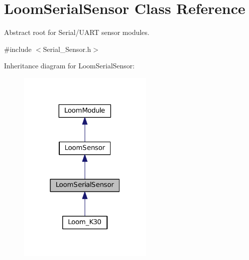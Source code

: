 \hypertarget{class_loom_serial_sensor}{}\section{Loom\+Serial\+Sensor Class Reference}
\label{class_loom_serial_sensor}


Abstract root for Serial/\+U\+A\+RT sensor modules.  




{\ttfamily \#include $<$Serial\+\_\+\+Sensor.\+h$>$}



Inheritance diagram for Loom\+Serial\+Sensor\+:\nopagebreak
\begin{figure}[H]
\begin{center}
\leavevmode
\includegraphics[width=184pt]{class_loom_serial_sensor__inherit__graph}
\end{center}
\end{figure}
